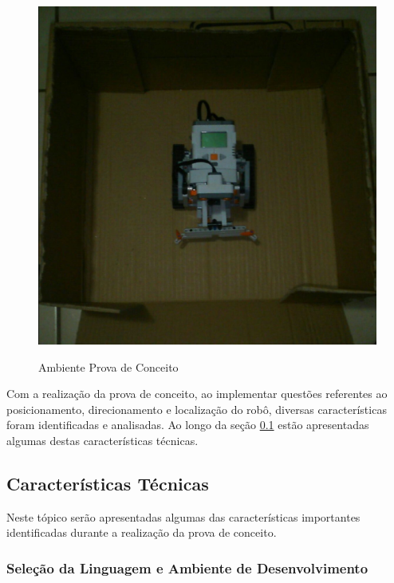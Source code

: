		\begin{figure}[H]
			\centering
			\includegraphics[scale=0.4]{figuras/ambienteConceito.eps}
			\label{img:ambienteProva}
			\caption{Ambiente Prova de Conceito}
		\end{figure}

		Com a realização da prova de conceito, ao implementar questões referentes ao posicionamento, direcionamento e localização do robô, diversas características foram identificadas e analisadas. Ao longo da seção \ref{sub:características_técnicas} estão apresentadas algumas destas características técnicas.


	\subsection{Características Técnicas} %
	\label{sub:características_técnicas}

		Neste tópico serão apresentadas algumas das características importantes identificadas durante a realização da prova de conceito.

		\subsubsection{Seleção da Linguagem e Ambiente de Desenvolvimento}

